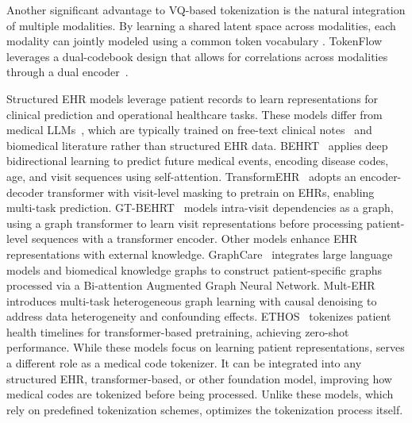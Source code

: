 Another significant advantage to VQ-based tokenization is the natural integration of multiple modalities. By learning a shared latent space across modalities, each modality can jointly modeled using a common token vocabulary \cite{agarwal2025cosmos, yu2023language}. 
TokenFlow leverages a dual-codebook design that allows for correlations across modalities through a dual encoder~\cite{qu2024tokenflow}.


%
Structured EHR models leverage patient records to learn representations for clinical prediction and operational healthcare tasks. These models differ from medical LLMs~\cite{singhal2025toward,tu2024towards,singhal2023large}, which are typically trained on free-text clinical notes~\cite{jiang2023health} and biomedical literature rather than structured EHR data.  
%
BEHRT~\cite{li2020behrt} applies deep bidirectional learning to predict future medical events, encoding disease codes, age, and visit sequences using self-attention. TransformEHR~\cite{transform_ehr} adopts an encoder-decoder transformer with visit-level masking to pretrain on EHRs, enabling multi-task prediction. GT-BEHRT~\cite{gtbehrt} models intra-visit dependencies as a graph, using a graph transformer to learn visit representations before processing patient-level sequences with a transformer encoder.  
%
Other models enhance EHR representations with external knowledge. GraphCare~\cite{graphcare} integrates large language models and biomedical knowledge graphs to construct patient-specific graphs processed via a Bi-attention Augmented Graph Neural Network. Mult-EHR~\cite{mult_ehr} introduces multi-task heterogeneous graph learning with causal denoising to address data heterogeneity and confounding effects. ETHOS~\cite{ethos} tokenizes patient health timelines for transformer-based pretraining, achieving zero-shot performance.  
%
While these models focus on learning patient representations, \model serves a different role as a medical code tokenizer. It can be integrated into any structured EHR, transformer-based, or other foundation model, improving how medical codes are tokenized before being processed. Unlike these models, which rely on predefined tokenization schemes, \model optimizes the tokenization process itself.